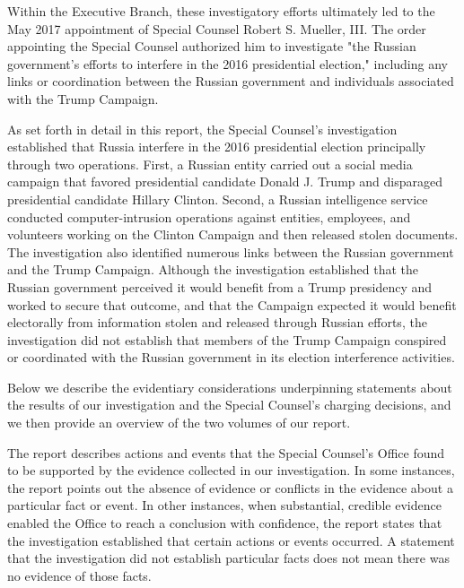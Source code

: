 Within the Executive Branch, these investigatory efforts ultimately led to the May 2017 appointment of Special Counsel Robert S. Mueller, III\null.
The order appointing the Special Counsel authorized him to investigate "the Russian government's efforts to interfere in the 2016 presidential election," including any links or coordination between the Russian government and individuals associated with the Trump Campaign.

As set forth in detail in this report, the Special Counsel's investigation established that Russia interfere in the 2016 presidential election principally through two operations.
First, a Russian entity carried out a social media campaign that favored presidential candidate Donald J. Trump and disparaged presidential candidate Hillary Clinton.
Second, a Russian intelligence service conducted computer-intrusion operations against entities, employees, and volunteers working on the Clinton Campaign and then released stolen documents.
The investigation also identified numerous links between the Russian government and the Trump Campaign.
Although the investigation established that the Russian government perceived it would benefit from a Trump presidency and worked to secure that outcome, and that the Campaign expected it would benefit electorally from information stolen and released through Russian efforts, the investigation did not establish that members of the Trump Campaign conspired or coordinated with the Russian government in its election interference activities.

\hr

Below we describe the evidentiary considerations underpinning statements about the results of our investigation and the Special Counsel's charging decisions, and we then provide an overview of the two volumes of our report.

The report describes actions and events that the Special Counsel's Office found to be supported by the evidence collected in our investigation.
In some instances, the report points out the absence of evidence or conflicts in the evidence about a particular fact or event.
In other instances, when substantial, credible evidence enabled the Office to reach a conclusion with confidence, the report states that the investigation established that certain actions or events occurred.
A statement that the investigation did not establish particular facts does not mean there was no evidence of those facts.

